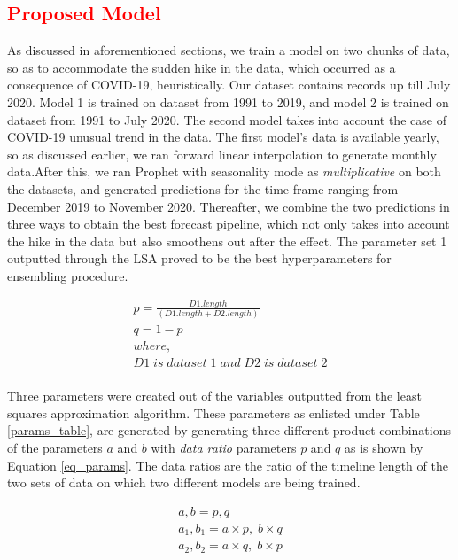 \documentclass[times,twocolumn,final,authoryear]{elsarticle}
\begin{document}
	
	\subsection{\textcolor{red}{Proposed Model}}
	As discussed in aforementioned sections, we train a model on two chunks of data, so as to accommodate the sudden hike in the data, which occurred as a consequence of COVID-19, heuristically. Our dataset contains records up till July 2020. Model 1 is trained on dataset from 1991 to 2019, and model 2 is trained on dataset from 1991 to July 2020. The second model takes into account the case of COVID-19 unusual trend in the data. The first model's data is available yearly, so as discussed earlier, we ran forward linear interpolation to generate monthly data.After this, we ran Prophet with seasonality mode as \emph{multiplicative} on both the datasets, and generated predictions for the time-frame ranging from December 2019 to November 2020. Thereafter, we combine the two predictions in three ways to obtain the best forecast pipeline, which not only takes into account the hike in the data but also smoothens out after the effect. The parameter set 1 outputted through the LSA proved to be the best hyperparameters for ensembling procedure.
	
	\begin{equation}
		\label{data_ratios}
		\begin{array}{l}
			p = \frac{D1.length}{(D1.length + D2.length)}  \\
			q = 1 - p  \\
			where,\\
			D1 \; is \; dataset \; 1 \; and \; D2 \; is \; dataset \; 2\\
		\end{array}
	\end{equation}
	
	Three parameters were created out of the variables outputted from the least squares approximation algorithm. These parameters as enlisted under Table \ref{params_table}, are generated by generating three different product combinations of the parameters \(a\) and \(b\) with \emph{data ratio} parameters \(p\) and \(q\) as is shown by Equation \ref{eq_params}. The data ratios  are the ratio of the timeline length of the two sets of data on which two different models are being trained.
	
	\begin{equation}
		\label{eq_params}
		\begin{array}{l}
			a, b = p, q \\
			a_1, b_1 = a\times p, \; b\times q \\
			a_2, b_2 = a\times q, \; b\times p \\
		\end{array}
	\end{equation}
	
\end{document}
